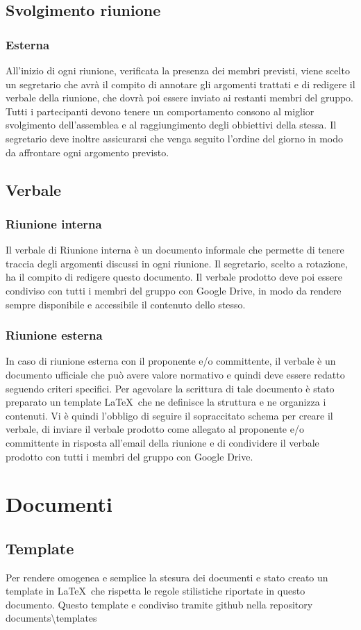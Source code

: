 \documentclass[a4paper]{report}
\newcommand{\mychapter}[2]{
	\setcounter{chapter}{#1}
	\setcounter{section}{0}
	\setcounter{subsection}{1}
	\chapter*{#2}
	\addcontentsline{toc}{chapter}{#2}
}
\begin{document}
	\section{Svolgimento riunione}
		\subsection{Esterna}
			All'inizio di ogni riunione, verificata la presenza dei membri previsti, viene scelto un
			segretario che avrà il compito di annotare gli argomenti trattati e di redigere il verbale
			della riunione, che dovrà poi essere inviato ai restanti membri del gruppo.
			Tutti i partecipanti devono tenere un comportamento consono al miglior svolgimento
			dell'assemblea e al raggiungimento degli obbiettivi della stessa. Il segretario deve inoltre assicurarsi che venga seguito l'ordine del giorno in modo da affrontare ogni argomento previsto.
			\section{Verbale}
			\subsection{Riunione interna}
			Il verbale di Riunione interna è un documento informale che permette di tenere traccia
			degli argomenti discussi in ogni riunione.
			Il segretario, scelto a rotazione, ha il compito di redigere questo documento.
			Il verbale prodotto deve poi essere condiviso con tutti i membri del gruppo con Google
			Drive, in modo da rendere sempre disponibile e accessibile il contenuto dello stesso.
		\subsection{Riunione esterna}
			In caso di riunione esterna con il proponente e/o committente, il verbale è un documento
			ufficiale che può avere valore normativo e quindi deve essere redatto seguendo criteri
			specifici.
			Per agevolare la scrittura di tale documento è stato preparato un template \LaTeX\ che
			ne definisce la struttura e ne organizza i contenuti. Vi è quindi l'obbligo di seguire
			il sopraccitato schema per creare il verbale, di inviare il verbale prodotto come allegato al 
			proponente e/o committente in risposta all'email della riunione e di condividere il 
			verbale prodotto con tutti i membri del gruppo con Google Drive.
	
	\mychapter{4}{Documenti}
	\section{Template}
	Per rendere omogenea e semplice la stesura dei documenti e stato creato un template in \LaTeX\ che rispetta le regole stilistiche riportate in questo documento. Questo template e condiviso tramite github nella repository  documents\textbackslash templates 
\end{document}
